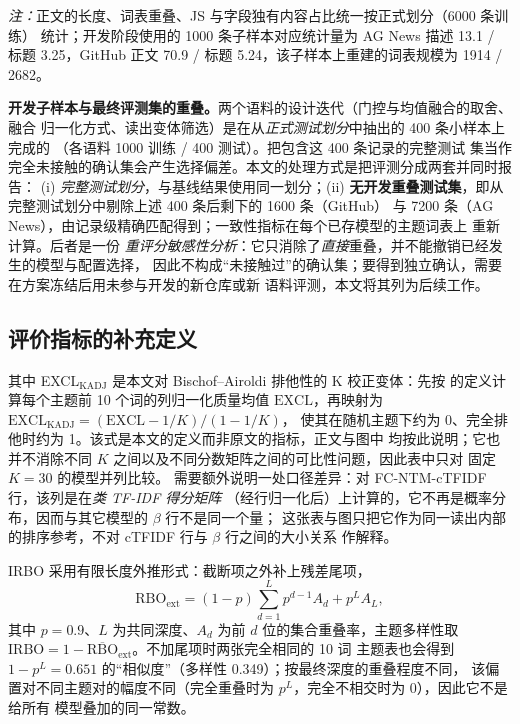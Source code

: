 \documentclass[11pt]{ctexart}
\newcommand{\fcntm}{FC-NTM}
\begin{document}
\emph{注：}正文的长度、词表重叠、JS 与字段独有内容占比统一按正式划分（6000 条训练）
统计；开发阶段使用的 1000 条子样本对应统计量为 AG News 描述 13.1 / 标题 3.25，GitHub
正文 70.9 / 标题 5.24，该子样本上重建的词表规模为 1914 / 2682。

\textbf{开发子样本与最终评测集的重叠。}两个语料的设计迭代（门控与均值融合的取舍、融合
归一化方式、读出变体筛选）是在从\emph{正式测试划分}中抽出的 400 条小样本上完成的
（各语料 1000 训练 / 400 测试）。把包含这 400 条记录的完整测试
集当作完全未接触的确认集会产生选择偏差。本文的处理方式是把评测分成两套并同时报告：
(i) \emph{完整测试划分}，与基线结果使用同一划分；(ii)
\textbf{无开发重叠测试集}，即从完整测试划分中剔除上述 400 条后剩下的 1600 条（GitHub）
与 7200 条（AG News），由记录级精确匹配得到；一致性指标在每个已存模型的主题词表上
重新计算。后者是一份
\emph{重评分敏感性分析}：它只消除了\emph{直接}重叠，并不能撤销已经发生的模型与配置选择，
因此不构成“未接触过”的确认集；要得到独立确认，需要在方案冻结后用未参与开发的新仓库或新
语料评测，本文将其列为后续工作。

\subsection*{评价指标的补充定义}

其中 EXCL$_{\mathrm{KADJ}}$ 是本文对 Bischof--Airoldi 排他性的 K 校正变体：先按
\cite{bischof2012exclusivity} 的定义计算每个主题前 10 个词的列归一化质量均值
$\mathrm{EXCL}$，再映射为 $\mathrm{EXCL}_{\mathrm{KADJ}}=(\mathrm{EXCL}-1/K)/(1-1/K)$，
使其在随机主题下约为 0、完全排他时约为 1。该式是本文的定义而非原文的指标，正文与图中
均按此说明；它也并不消除不同 $K$ 之间以及不同分数矩阵之间的可比性问题，因此表中只对
固定 $K=30$ 的模型并列比较。
需要额外说明一处口径差异：对 \fcntm{}-cTFIDF 行，该列是在\emph{类 TF-IDF 得分矩阵}
（经行归一化后）上计算的，它不再是概率分布，因而与其它模型的 $\beta$ 行不是同一个量；
这张表与图只把它作为同一读出内部的排序参考，不对 cTFIDF 行与 $\beta$ 行之间的大小关系
作解释。

IRBO 采用有限长度外推形式：截断项之外补上残差尾项，
\begin{equation}
\mathrm{RBO}_{\mathrm{ext}}=(1-p)\sum_{d=1}^{L}p^{d-1}A_d
+p^{L}A_L ,
\label{eq:rbo}
\end{equation}
其中 $p=0.9$、$L$ 为共同深度、$A_d$ 为前 $d$ 位的集合重叠率，主题多样性取
$\mathrm{IRBO}=1-\overline{\mathrm{RBO}}_{\mathrm{ext}}$。不加尾项时两张完全相同的 10 词
主题表也会得到 $1-p^{L}=0.651$ 的“相似度”（多样性 0.349）；按最终深度的重叠程度不同，
该偏置对不同主题对的幅度不同（完全重叠时为 $p^{L}$，完全不相交时为 0），因此它不是给所有
模型叠加的同一常数。
\end{document}
